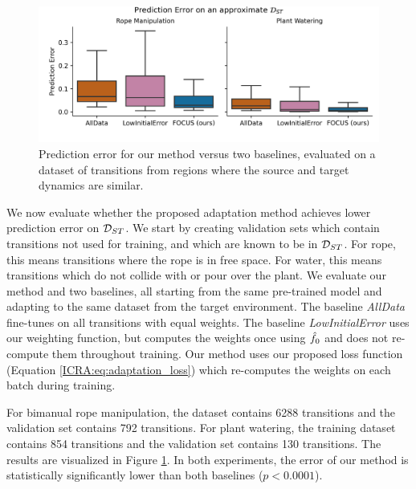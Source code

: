 \begin{figure}
    \centering
    \includegraphics[width=\linewidth]{Chap4/images/known_good_model_error.png}
    \caption{Prediction error for our method versus two baselines, evaluated on a dataset of transitions from regions where the source and target dynamics are similar.}
    \label{ICRA:fig:validating}
\end{figure}

We now evaluate whether the proposed adaptation method achieves lower prediction error on $\mathcal{D}_{ST}$. We start by creating validation sets which contain transitions not used for training, and which are known to be in $\mathcal{D}_{ST}$. For rope, this means transitions where the rope is in free space. For water, this means transitions which do not collide with or pour over the plant. We evaluate our method and two baselines, all starting from the same pre-trained model and adapting to the same dataset from the target environment. The baseline \textit{AllData} fine-tunes on all transitions with equal weights. The baseline \textit{LowInitialError} uses our weighting function, but computes the weights once using $\hat{f}_0$ and does not re-compute them throughout training. Our method uses our proposed loss function (Equation \eqref{ICRA:eq:adaptation_loss}) which re-computes the weights on each batch during training.

For bimanual rope manipulation, the dataset contains 6288 transitions and the validation set contains 792 transitions. For plant watering, the training dataset contains 854 transitions and the validation set contains 130 transitions. The results are visualized in Figure \ref{ICRA:fig:validating}. In both experiments, the error of our method is statistically significantly lower than both baselines ($p<0.0001$).


